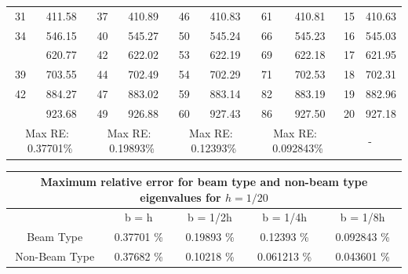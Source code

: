 \documentclass[8pt]{beamer}
\begin{document}
\begin{frame}
\begin{table}[ht]
{{\begin{tabular}{|cc|cc|cc|cc||cc|}
                {31} & 411.58 & {37} & 410.89 & {46} & 410.83 & {61} & 410.81 & {15} & {410.63} \\
                {34} & 546.15 & {40} & 545.27 & {50} & 545.24 & {66} & 545.23 & {16} & {545.03} \\
                \rowcolor{lightgray}{37} & 620.77 & {42} & 622.02 & {53} & 622.19 & {69} & 622.18 & {17} & {621.95} \\
                {39} & 703.55 & {44} & 702.49 & {54} & 702.29 & {71} & 702.53 & {18} & {702.31} \\
                {42} & 884.27 & {47} & 883.02 & {59} & 883.14 & {82} & 883.19 & {19} & {882.96} \\
                \rowcolor{lightgray}{44} & 923.68 & {49} & 926.88 & {60} & 927.43 & {86} & 927.50 & {20} & {927.18} \\
                \hline
                \hline
                \multicolumn{2}{|c|}{Max RE: \  0.37701\%} &\multicolumn{2}{c|}{Max RE: \ 0.19893\%}  & \multicolumn{2}{c|}{Max RE: \  0.12393\%}  & \multicolumn{2}{c||}{Max RE: \ 0.092843\%}& \multicolumn{2}{c|}{-} \\
                \hline
            \end{tabular}%
            \label{tab:2v3_2}%
        }}
        \end{table}%
    \end{frame}

    \begin{frame}
        \begin{table}[htbp]
            \centering
            \begin{tabular}{|c|cccc|}
                \hline
                \multicolumn{5}{|c|}{Maximum relative error for beam type and non-beam type eigenvalues for $h = 1/20$} \\
                \hline
                \hline
                & {b = h} & {b = 1/2h} & {b = 1/4h} & {b = 1/8h} \\
                \hline
                Beam Type & 0.37701 \% & 0.19893 \% & 0.12393 \% & 0.092843 \% \\
                Non-Beam Type & 0.37682 \% & 0.10218 \% & 0.061213 \% & 0.043601 \% \\
                \hline
            \end{tabular}%
            \label{tab:2v3_2_split}%
        \end{table}%
    \end{frame}
\end{document}
